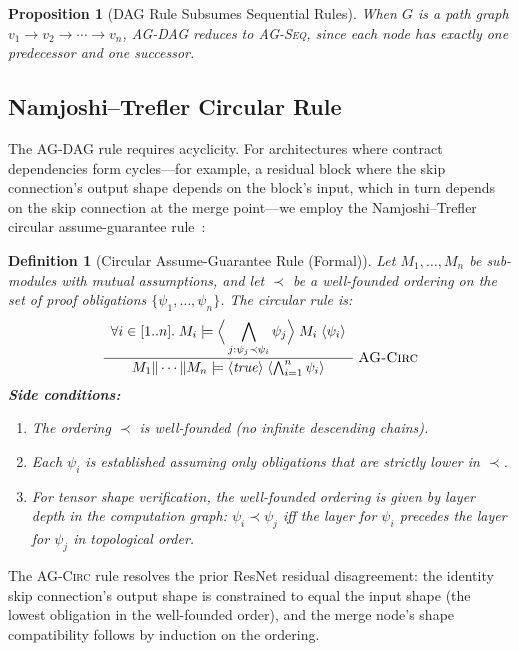 \documentclass[11pt]{article}
\newtheorem{definition}[theorem]{Definition}
\newtheorem{proposition}[theorem]{Proposition}
\begin{document}
\begin{proposition}[DAG Rule Subsumes Sequential Rules]
When $G$ is a path graph $v_1 \to v_2 \to \cdots \to v_n$,
\textsc{AG-DAG} reduces to \textsc{AG-Seq}, since each node has
exactly one predecessor and one successor.
\end{proposition}

\subsection{Namjoshi--Trefler Circular Rule}\label{app:ag-circ}

The \textsc{AG-DAG} rule requires acyclicity.  For architectures
where contract dependencies form cycles---for example, a residual
block where the skip connection's output shape depends on the
block's input, which in turn depends on the skip connection at the
merge point---we employ the Namjoshi--Trefler circular
assume-guarantee rule~\cite{namjoshi10}:

\begin{definition}[Circular Assume-Guarantee Rule (Formal)]
Let $M_1, \ldots, M_n$ be sub-modules with mutual assumptions,
and let $\prec$ be a well-founded ordering on the set of proof
obligations $\{\psi_1, \ldots, \psi_n\}$.  The circular rule is:
\[
\frac{
  \begin{array}{c}
  \forall i \in [1..n].\;
  M_i \models
  \Big\langle \displaystyle\bigwedge_{j : \psi_j \prec \psi_i} \psi_j \Big\rangle\;
  M_i \;\langle \psi_i \rangle
  \end{array}
}{
  M_1 \| \cdots \| M_n \models
  \langle \mathit{true} \rangle \;\langle \bigwedge_{i=1}^{n} \psi_i \rangle
}
\;\textsc{AG-Circ}
\]
\textbf{Side conditions:}
\begin{enumerate}[leftmargin=2em,nosep]
  \item The ordering $\prec$ is well-founded (no infinite
    descending chains).
  \item Each $\psi_i$ is established assuming only obligations
    that are strictly lower in $\prec$.
  \item For tensor shape verification, the well-founded ordering
    is given by layer depth in the computation graph:
    $\psi_i \prec \psi_j$ iff the layer for $\psi_i$ precedes
    the layer for $\psi_j$ in topological order.
\end{enumerate}
\end{definition}

\noindent
The \textsc{AG-Circ} rule resolves the prior ResNet residual
disagreement: the identity skip connection's output shape is
constrained to equal the input shape (the lowest obligation in the
well-founded order), and the merge node's shape compatibility
follows by induction on the ordering.
\end{document}
